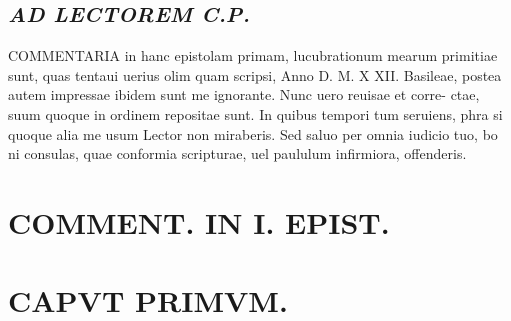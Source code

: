 \documentclass{article}
\begin{document}
\begin{pages}
\subsection*{\textit{AD LECTOREM C.P. }}\pstart COMMENTARIA in hanc epistolam primam, lucubrationum mearum primitiae sunt, quas tentaui uerius olim quam scripsi, Anno D. M. X XII. Basileae, postea autem impressae ibidem sunt me ignorante. Nunc uero reuisae et corre- ctae, suum quoque in ordinem repositae sunt. In quibus tempori tum seruiens, phra si quoque alia me usum Lector non miraberis. Sed saluo per omnia iudicio tuo, bo ni consulas, quae conformia scripturae, uel paululum infirmiora, offenderis.  \pend
\section*{COMMENT. IN I. EPIST. }
\marginpar{[ p.464 ]}
\endnumbering\beginnumbering\section{CAPVT PRIMVM.}
{}

\end{pages}
\end{document}
